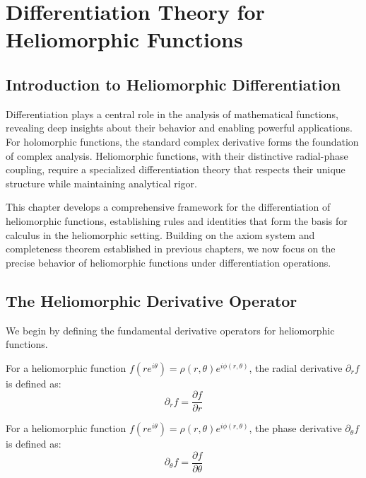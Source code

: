 \chapter{Differentiation Theory for Heliomorphic Functions}

\section{Introduction to Heliomorphic Differentiation}

Differentiation plays a central role in the analysis of mathematical functions, revealing deep insights about their behavior and enabling powerful applications. For holomorphic functions, the standard complex derivative forms the foundation of complex analysis. Heliomorphic functions, with their distinctive radial-phase coupling, require a specialized differentiation theory that respects their unique structure while maintaining analytical rigor.

This chapter develops a comprehensive framework for the differentiation of heliomorphic functions, establishing rules and identities that form the basis for calculus in the heliomorphic setting. Building on the axiom system and completeness theorem established in previous chapters, we now focus on the precise behavior of heliomorphic functions under differentiation operations.

\section{The Heliomorphic Derivative Operator}

We begin by defining the fundamental derivative operators for heliomorphic functions.

\begin{definition}
For a heliomorphic function $f(re^{i\theta}) = \rho(r,\theta)e^{i\phi(r,\theta)}$, the radial derivative $\partial_r f$ is defined as:
\begin{equation}
\partial_r f = \frac{\partial f}{\partial r}
\end{equation}
\end{definition}

\begin{definition}
For a heliomorphic function $f(re^{i\theta}) = \rho(r,\theta)e^{i\phi(r,\theta)}$, the phase derivative $\partial_\theta f$ is defined as:
\begin{equation}
\partial_\theta f = \frac{\partial f}{\partial \theta}
\end{equation}
\end{definition}

